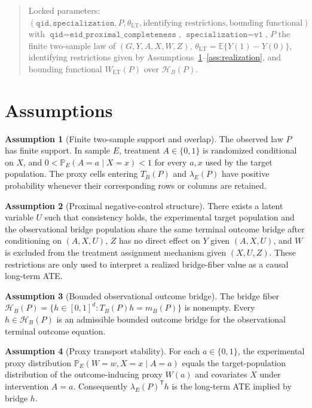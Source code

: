 \documentclass[11pt]{article}
\newcommand{\E}{\mathbb{E}}
\renewcommand{\Pr}{\mathbb{P}}
\newcommand{\transpose}{\mathsf{T}}
\newcommand{\calH}{\mathcal{H}}
\theoremstyle{definition}
\newtheorem{assumption}{Assumption}
\theoremstyle{plain}
\theoremstyle{remark}
\begin{document}
\begin{quote}
Locked parameters: \((\texttt{qid},\texttt{specialization}, P,
\theta_{\mathrm{LT}},\text{identifying restrictions},\text{bounding
functional})\) with \(\texttt{qid}=\texttt{eid\_proximal\_completeness}\),
\(\texttt{specialization}=\texttt{v1}\), \(P\) the finite two-sample law of
\((G,Y,A,X,W,Z)\), \(\theta_{\mathrm{LT}}=\E\{Y(1)-Y(0)\}\), identifying
restrictions given by Assumptions~\ref{ass:sampling}--\ref{ass:realization},
and bounding functional \(W_{\mathrm{LT}}(P)\) over \(\calH_B(P)\).
\end{quote}

\section{Assumptions}
\begin{assumption}[Finite two-sample support and overlap]\label{ass:sampling}
The observed law \(P\) has finite support.  In sample \(E\), treatment
\(A\in\{0,1\}\) is randomized conditional on \(X\), and
\(0<\Pr_E(A=a\mid X=x)<1\) for every \(a,x\) used by the target population.
The proxy cells entering \(T_B(P)\) and \(\lambda_E(P)\) have positive
probability whenever their corresponding rows or columns are retained.
\end{assumption}

\begin{assumption}[Proximal negative-control structure]\label{ass:proximal-structure}
There exists a latent variable \(U\) such that consistency holds, the
experimental target population and the observational bridge population share
the same terminal outcome bridge after conditioning on \((A,X,U)\), \(Z\) has
no direct effect on \(Y\) given \((A,X,U)\), and \(W\) is excluded from the
treatment assignment mechanism given \((X,U,Z)\).  These restrictions are
only used to interpret a realized bridge-fiber value as a causal long-term ATE.
\end{assumption}

\begin{assumption}[Bounded observational outcome bridge]\label{ass:bridge-existence}
The bridge fiber \(\calH_B(P)=\{h\in[0,1]^d:T_B(P)h=m_B(P)\}\) is nonempty.
Every \(h\in\calH_B(P)\) is an admissible bounded outcome bridge for the
observational terminal outcome equation.
\end{assumption}

\begin{assumption}[Proxy transport stability]\label{ass:transport}
For each \(a\in\{0,1\}\), the experimental proxy distribution
\(\Pr_E(W=w,X=x\mid A=a)\) equals the target-population distribution of the
outcome-inducing proxy \(W(a)\) and covariates \(X\) under intervention \(A=a\).
Consequently \(\lambda_E(P)^\transpose h\) is the long-term ATE implied by
bridge \(h\).
\end{assumption}
\end{document}
